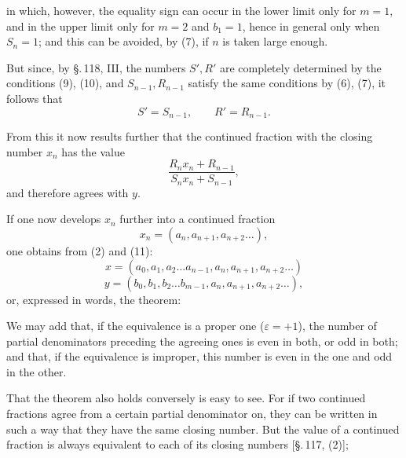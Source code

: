 in which, however, the equality sign can occur in the lower limit only for $m = 1$, and in the upper limit only for $m = 2$ and $b_1 = 1$, hence in general only when $S_n = 1$; and this can be avoided, by (7), if $n$ is taken large enough.

But since, by \S.\,118, III, the numbers $S', R'$ are completely determined by the conditions (9), (10), and $S_{n-1}, R_{n-1}$ satisfy the same conditions by (6), (7), it follows that
\[
S' = S_{n-1}, \qquad R' = R_{n-1}.
\]

From this it now results further that the continued fraction with the closing number $x_n$
has the value
\[
\dfrac{R_n x_n + R_{n-1}}{S_n x_n + S_{n-1}},
\]
and therefore agrees with $y$.

If one now develops $x_n$ further into a continued fraction
\[
x_n = (a_n, a_{n+1}, a_{n+2} \ldots),
\]
one obtains from (2) and (11):
\[
x = (a_0, a_1, a_2 \ldots a_{n-1}, a_n, a_{n+1}, a_{n+2} \ldots)
\]
\[
y = (b_0, b_1, b_2 \ldots b_{m-1}, a_n, a_{n+1}, a_{n+2} \ldots),
\]
or, expressed in words, the theorem:


We may add that, if the equivalence is a proper one ($\varepsilon = +1$), the number of partial denominators preceding the agreeing ones is even in both, or odd in both; and that, if the equivalence is improper, this number is even in the one and odd in the other.

That the theorem also holds conversely is easy to see. For if two continued fractions agree from a certain partial denominator on, they can be written in such a way that they have the same closing number. But the value of a continued fraction is always equivalent to each of its closing numbers [\S.\,117, (2)]; 
